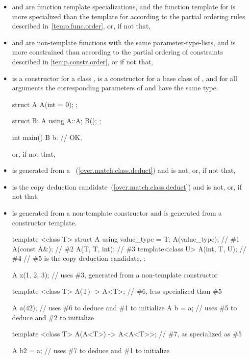 \begin{itemize}
\item
{}
and
are
function template specializations,
and the function template
for
is more specialized than the template for
according to the partial ordering rules described in~\ref{temp.func.order},
or, if not that,

\item
{} and  are non-template functions with the same
parameter-type-lists, and   is more constrained than 
according to the partial ordering of constraints described in
\ref{temp.constr.order}, or if not that,

\item
{} is a constructor for a class ,
 is a constructor for a base class  of , and
for all arguments
the corresponding parameters of  and  have the same type.
\begin{example}
\begin{codeblock}
struct A {
  A(int = 0);
};

struct B: A {
  using A::A;
  B();
};

int main() {
  B b;  // OK, 
}
\end{codeblock}
\end{example}
or, if not that,

\item
{} is generated from a
~(\ref{over.match.class.deduct})
and  is not, or, if not that,

\item
{} is the copy deduction candidate~(\ref{over.match.class.deduct})
and  is not, or, if not that,

\item
{} is generated from a non-template constructor
and  is generated from a constructor template.
\begin{example}
\begin{codeblock}
template <class T> struct A {
  using value_type = T;
  A(value_type);    // \#1
  A(const A&);      // \#2
  A(T, T, int);     // \#3
  template<class U>
    A(int, T, U);   // \#4
  // \#5 is the copy deduction candidate, 
};

A x(1, 2, 3);       // uses \#3, generated from a non-template constructor

template <class T>
A(T) -> A<T>;       // \#6, less specialized than \#5

A a(42);            // uses \#6 to deduce  and \#1 to initialize
A b = a;            // uses \#5 to deduce  and \#2 to initialize

template <class T>
A(A<T>) -> A<A<T>>; // \#7, as specialized as \#5

A b2 = a;           // uses \#7 to deduce  and \#1 to initialize
\end{codeblock}
\end{example}
\end{itemize}

